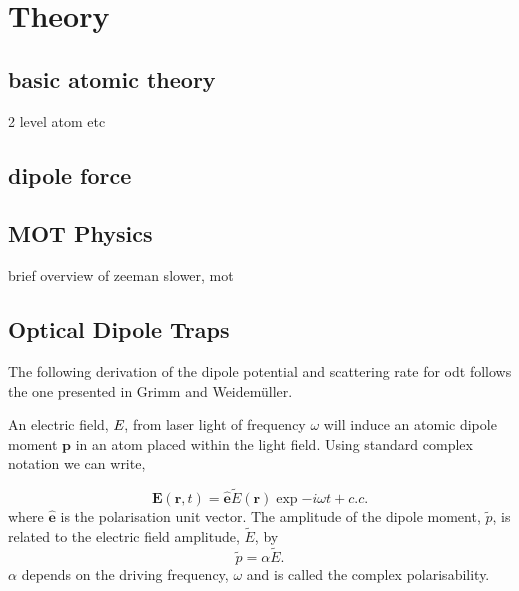 \chapter{Theory}

\section{basic atomic theory}

2 level atom etc

\section{dipole force}

\section{MOT Physics}

brief overview of zeeman slower, mot

\section{Optical Dipole Traps}

The following derivation of the dipole potential and scattering rate for \gls{odt} follows the one presented in Grimm and Weidem\"uller\cite{grimm_optical_2000}.

An electric field, $\emph{E}$, from laser light of frequency $\omega$ will induce an atomic dipole moment $\boldsymbol{p}$ in an atom placed within the light field. Using standard complex notation we can write,

\begin{equation}\label{eq:efield}
\boldsymbol E (\boldsymbol r ,t)=\hat{\boldsymbol e} \tilde E (\boldsymbol r) \exp{-i\omega t + c.c.}
\end{equation}
where $\hat{\boldsymbol{e}}$ is the polarisation unit vector. The amplitude of the dipole moment, $\tilde p$, is related to the electric field amplitude, $\tilde E$, by
\begin{equation}\label{eq:polarisability}
\tilde p = \alpha \tilde E.
\end{equation}
$\alpha$ depends on the driving frequency, $\omega$ and is called the complex polarisability.

